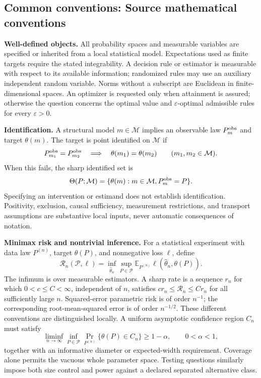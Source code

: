 \documentclass[11pt,a4paper]{article}
\newcommand{\E}{\mathbb E}
\begin{document}
\subsection*{Common conventions: Source mathematical conventions}

\textbf{Well-defined objects.}
All probability spaces and measurable variables are specified or inherited
from a local statistical model. Expectations used as finite targets require
the stated integrability. A decision rule or estimator is measurable with
respect to its available information; randomized rules may use an auxiliary
independent random variable. Norms without a subscript are Euclidean in
finite-dimensional spaces. An optimizer is requested only when attainment
is assured; otherwise the question concerns the optimal value and
$\varepsilon$-optimal admissible rules for every $\varepsilon>0$.

\textbf{Identification.}
A structural model $m\in\mathcal M$ implies an observable law
$P_m^{\rm obs}$ and target $\theta(m)$. The target is point identified on
$\mathcal M$ if
\[
 P_{m_1}^{\rm obs}=P_{m_2}^{\rm obs}
 \quad\Longrightarrow\quad\theta(m_1)=\theta(m_2)
 \qquad(m_1,m_2\in\mathcal M).
\]
When this fails, the sharp identified set is
\[
 \Theta(P;\mathcal M)=\{\theta(m):m\in\mathcal M,
                                  P_m^{\rm obs}=P\}.
\]
Specifying an intervention or estimand does not establish identification.
Positivity, exclusion, causal sufficiency, measurement restrictions, and
transport assumptions are substantive local inputs, never automatic
consequences of notation.

\textbf{Minimax risk and nontrivial inference.}
For a statistical experiment with data law $P^{(n)}$, target $\theta(P)$,
and nonnegative loss $\ell$, define
\[
 \mathcal R_n(\mathcal P,\ell)
   =\inf_{\widehat\theta_n}\sup_{P\in\mathcal P}
      \E_{P^{(n)}}\ell(\widehat\theta_n,\theta(P)).
\]
The infimum is over measurable estimators. A sharp rate is a sequence
$r_n$ for which $0<c\leq C<\infty$, independent of $n$, satisfies
$c r_n\leq\mathcal R_n\leq C r_n$ for all sufficiently large $n$.
Squared-error parametric risk is of order $n^{-1}$; the corresponding
root-mean-squared error is of order $n^{-1/2}$. These different conventions
are distinguished locally. A uniform asymptotic confidence region $C_n$
must satisfy
\[
 \liminf_{n\to\infty}\inf_{P\in\mathcal P}
     \Pr_{P^{(n)}}\{\theta(P)\in C_n\}\geq 1-\alpha,
 \qquad 0<\alpha<1,
\]
together with an informative diameter or expected-width requirement.
Coverage alone permits the vacuous whole parameter space. Testing questions
similarly impose both size control and power against a declared separated
alternative class.
\end{document}
